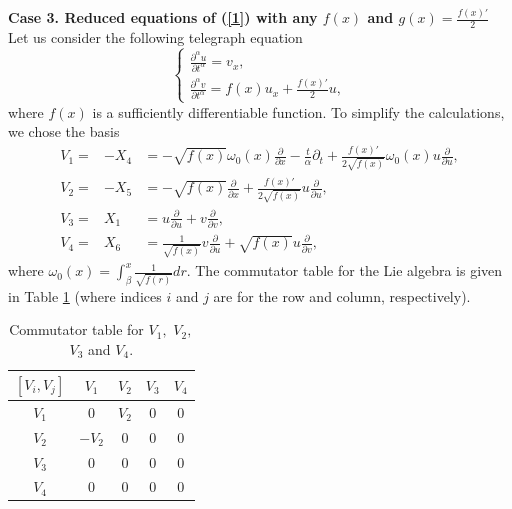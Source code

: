 \documentclass[12pt]{amsart}
\begin{document}
\textbf{Case 3. Reduced equations of (\ref{1}) with any $f(x)$ and $g(x)=\frac{f(x)'}{2}$} 
Let us consider the following telegraph equation
\begin{equation}\label{usys1}
    \begin{cases}
    \frac{\partial^\alpha u}{\partial t^\alpha}=v_x,\\
\frac{\partial^\alpha v}{\partial t^\alpha}=f(x) u_x+
\frac{f(x)'}{2}u,
    \end{cases}
\end{equation}
where $f(x)$ is a sufficiently differentiable function. To simplify the calculations, we chose the basis 
\begin{eqnarray}
    \nonumber
    V_1=&-X_4&=-\sqrt{f(x)}\omega_{0}(x) \frac{\partial}{\partial x}-\frac{t}{\alpha}\partial_t+\frac{f(x)'}{2\sqrt{f(x)}}\omega_{0}(x)u 
    \frac{\partial}{\partial u},\\
    \nonumber
    V_2=&-X_5&=-\sqrt{f(x)}\frac{\partial}{\partial x}+\frac{f(x)'}{2\sqrt{f(x)}}u\frac{\partial}{\partial u},\\
    \nonumber
     V_3=&X_1&=u\frac{\partial}{\partial u}+v\frac{\partial}{\partial v},\\
    \nonumber
    V_4=&X_6&=\frac{1}{\sqrt{f(x)}}v\frac{\partial}{\partial u}+\sqrt{f(x)}u\frac{\partial}{\partial v},
\end{eqnarray}
where $\omega_{0}(x)=\int^x_{\beta} \frac{1}{\sqrt{f(r)}}dr$.
The commutator table for the Lie algebra is given in Table \ref{Table1} (where indices $i$ and $j$ are for the row and column, respectively).
\begin{table}[!ht]
\centering
\begin{tabular}{|c|c|c|c|c|}
 \hline
 $[V_i, V_j]$ & $V_1$ & $V_2$ & $V_3$ & $V_4$\\
 \hline
 $V_1$ & 0 & $V_2$ & 0 & 0 \\
 \hline
 $V_2$ &$-V_2$ & 0 & 0 & 0 \\
 \hline
 $V_3$ & 0 & 0 & 0 & 0 \\
 \hline
 $V_4$ & 0 & 0 & 0 & 0 \\ \hline
\end{tabular}
\caption{Commutator table for $V_1,$ $V_2,$ $V_3$ and $V_4$.}
\label{Table1}
\end{table}
\end{document}
